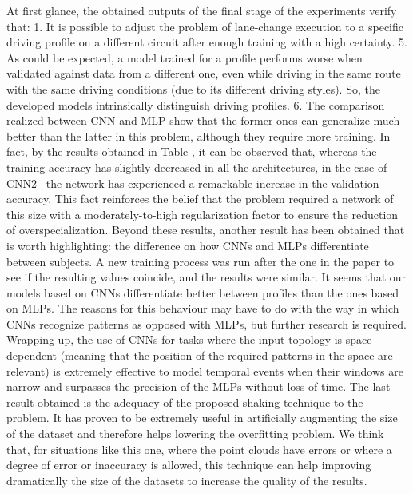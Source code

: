At first glance, the obtained outputs of the final stage of the experiments verify that:
1. It is possible to adjust the problem of lane-change execution to a specific driving profile on a different circuit after enough training with a high certainty.
5. As could be expected, a model trained for a profile performs worse when validated against data from a different one, even while driving in the same route with the same driving conditions (due to its different driving styles). So, the developed models intrinsically distinguish driving profiles.
6. The comparison realized between CNN and MLP show that the former ones can generalize much better than the latter in this problem, although they require more training. In fact, by the results obtained in Table , it can be observed that, whereas the training accuracy has slightly decreased in all the architectures, in the case of CNN2-- the network has experienced a remarkable increase in the validation accuracy. This fact reinforces the belief that the problem required a network of this size with a moderately-to-high regularization factor to ensure the reduction of overspecialization.
Beyond these results, another result has been obtained that is worth highlighting: the difference on how CNNs and MLPs differentiate between subjects. A new training process was run after the one in the paper to see if the resulting values coincide, and the results were similar. It seems that our models based on CNNs differentiate better between profiles than the ones based on MLPs. The reasons for this behaviour may have to do with the way in which CNNs recognize patterns as opposed with MLPs, but further research is required.
Wrapping up, the use of CNNs for tasks where the input topology is space-dependent (meaning that the position of the required patterns in the space are relevant) is extremely effective to model temporal events when their windows are narrow and surpasses the precision of the MLPs without loss of time.
The last result obtained is the adequacy of the proposed shaking technique to the problem. It has proven to be extremely useful in artificially augmenting the size of the dataset and therefore helps lowering the overfitting problem. We think that, for situations like this one, where the point clouds have errors or where a degree of error or inaccuracy is allowed, this technique can help improving dramatically the size of the datasets to increase the quality of the results.